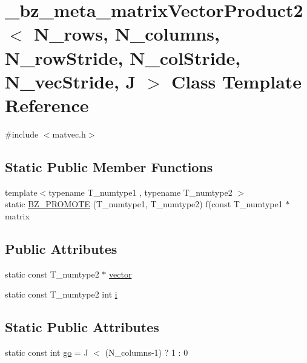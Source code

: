 \hypertarget{class__bz__meta__matrixVectorProduct2}{}\section{\+\_\+bz\+\_\+meta\+\_\+matrix\+Vector\+Product2$<$ N\+\_\+rows, N\+\_\+columns, N\+\_\+row\+Stride, N\+\_\+col\+Stride, N\+\_\+vec\+Stride, J $>$ Class Template Reference}
\label{class__bz__meta__matrixVectorProduct2}


{\ttfamily \#include $<$matvec.\+h$>$}

\subsection*{Static Public Member Functions}
\begin{DoxyCompactItemize}
\item 
{\footnotesize template$<$typename T\+\_\+numtype1 , typename T\+\_\+numtype2 $>$ }\\static \hyperlink{class__bz__meta__matrixVectorProduct2_a7f725aa0292c36f2d007023c063893eb}{B\+Z\+\_\+\+P\+R\+O\+M\+O\+T\+E} (T\+\_\+numtype1, T\+\_\+numtype2) f(const T\+\_\+numtype1 $\ast$matrix
\end{DoxyCompactItemize}
\subsection*{Public Attributes}
\begin{DoxyCompactItemize}
\item 
static const T\+\_\+numtype2 $\ast$ \hyperlink{class__bz__meta__matrixVectorProduct2_a8012c4165e3e64a4946e956ab8edbd3a}{vector}
\item 
static const T\+\_\+numtype2 int \hyperlink{class__bz__meta__matrixVectorProduct2_af9e76b1b2d8678fba66697883bcb937c}{i}
\end{DoxyCompactItemize}
\subsection*{Static Public Attributes}
\begin{DoxyCompactItemize}
\item 
static const int \hyperlink{class__bz__meta__matrixVectorProduct2_a3a77c6705adb1cc99578a91786f38389}{go} = J $<$ (N\+\_\+columns-\/1) ? 1 \+: 0
\end{DoxyCompactItemize}


